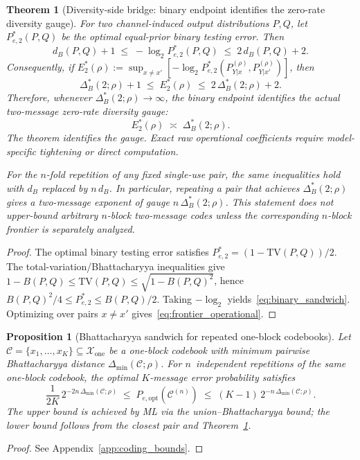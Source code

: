 \documentclass[lettersize,onecolumn]{IEEEtran}
\newtheorem{theorem}{Theorem}
\newtheorem{proposition}{Proposition}
\newcommand{\snr}{\rho}
\newcommand{\setX}{\mathcal{X}}
\newcommand{\setC}{\mathcal{C}}
\begin{document}
\begin{theorem}[Diversity-side bridge: binary endpoint identifies the
zero-rate diversity gauge]
\label{lem:binary_endpoint}
For two channel-induced output distributions $P,Q$, let
$P_{e,2}^*(P,Q)$ be the optimal equal-prior binary testing error.
Then
\begin{equation}\label{eq:binary_sandwich}
d_B(P,Q) + 1 \;\le\; -\log_2 P_{e,2}^*(P,Q) \;\le\;
2\,d_B(P,Q) + 2.
\end{equation}
Consequently, if\/ $E_2^*(\snr) := \sup_{x\ne x'}
[-\log_2 P_{e,2}^*(P_{Y|x}^{(\snr)},P_{Y|x'}^{(\snr)})]$,
then
\begin{equation}\label{eq:frontier_operational}
\Delta_B^*(2;\snr) + 1 \;\le\; E_2^*(\snr) \;\le\;
2\,\Delta_B^*(2;\snr) + 2.
\end{equation}
Therefore, whenever $\Delta_B^*(2;\snr)\to\infty$, the binary
endpoint identifies the actual two-message zero-rate diversity gauge:
\begin{equation}\label{eq:gauge_equiv}
E_2^*(\snr) \;\asymp\; \Delta_B^*(2;\snr).
\end{equation}
The theorem identifies the gauge. Exact raw operational coefficients
require model-specific tightening or direct computation.

For the $n$-fold repetition of any fixed single-use pair, the same
inequalities hold with $d_B$ replaced by $n\,d_B$. In particular,
repeating a pair that achieves $\Delta_B^*(2;\snr)$ gives a
two-message exponent of gauge $n\,\Delta_B^*(2;\snr)$. This
statement does not upper-bound arbitrary $n$-block two-message codes
unless the corresponding $n$-block frontier is separately analyzed.
\end{theorem}
\begin{proof}
The optimal binary testing error satisfies
$P_{e,2}^* = (1-\mathrm{TV}(P,Q))/2$.
The total-variation/Bhattacharyya inequalities give
$1-B(P,Q) \le \mathrm{TV}(P,Q) \le \sqrt{1-B(P,Q)^2}$,
hence $B(P,Q)^2/4 \le P_{e,2}^* \le B(P,Q)/2$.
Taking $-\log_2$ yields~\eqref{eq:binary_sandwich}.
Optimizing over pairs $x\ne x'$
gives~\eqref{eq:frontier_operational}.
\end{proof}

\begin{proposition}[Bhattacharyya sandwich for repeated one-block
codebooks]\label{thm:bridge}
Let $\setC = \{x_1,\dots,x_K\}\subseteq\setX_{\mathrm{one}}$ be a
one-block codebook with minimum pairwise Bhattacharyya distance
$\Delta_{\min}(\setC;\snr)$. For $n$~independent repetitions of the
same one-block codebook, the optimal $K$-message error probability
satisfies
\begin{equation}\label{eq:bridge}
\frac{1}{2K}\,2^{-2n\,\Delta_{\min}(\setC;\snr)}
\;\le\; P_{e,\mathrm{opt}}(\setC^{(n)})
\;\le\; (K-1)\,2^{-n\,\Delta_{\min}(\setC;\snr)}.
\end{equation}
The upper bound is achieved by ML via the union--Bhattacharyya bound;
the lower bound follows from the closest pair and
Theorem~\ref{lem:binary_endpoint}.
\end{proposition}
\begin{proof}
See Appendix~\ref{app:coding_bounds}.
\end{proof}
\end{document}
